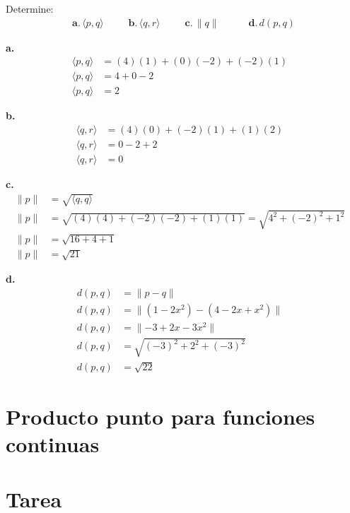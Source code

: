 \documentclass{article}
\begin{document}
    Determine:
    \begin{gather*}
        \textbf{a.}\hspace{2pt}\langle p,q\rangle\hspace{30pt}\textbf{b.}\hspace{2pt}\langle q,r\rangle\hspace{30pt}\textbf{c.}\hspace{2pt}\parallel q\parallel\hspace{35pt}\textbf{d.}\hspace{2pt}d(p,q)
    \end{gather*}

    \textbf{a.}
        \begin{align*}
            \langle p,q\rangle&= (4)(1)+(0)(-2)+(-2)(1) & \\
            \langle p,q\rangle&= 4+0-2 & \\
            \langle p,q\rangle&= 2
        \end{align*}

    \textbf{b.}
        \begin{align*}
            \langle q,r\rangle&= (4)(0)+(-2)(1)+(1)(2) & \\
            \langle q,r\rangle&= 0-2+2 & \\
            \langle q,r\rangle&= 0
        \end{align*}

    \textbf{c.}
        \begin{align*}
            \parallel p\parallel&= \sqrt{\langle q,q\rangle} & \\
            \parallel p\parallel&= \sqrt{(4)(4)+(-2)(-2)+(1)(1)}=\sqrt{4^{2}+(-2)^{2}+1^{2}} & \\
            \parallel p\parallel&= \sqrt{16+4+1} & \\
            \parallel p\parallel&= \sqrt{21}
        \end{align*}

    \textbf{d.}
        \begin{align*}
            d(p,q)&= \parallel p-q\parallel & \\
            d(p,q)&= \parallel (1-2x^{2})-(4-2x+x^{2})\parallel & \\
            d(p,q)&= \parallel -3+2x-3x^{2}\parallel & \\
            d(p,q)&= \sqrt{(-3)^{2}+2^{2}+(-3)^{2}} & \\
            d(p,q)&= \sqrt{22}
        \end{align*}

\section{Producto punto para funciones continuas}

\section{Tarea}

\end{document}
